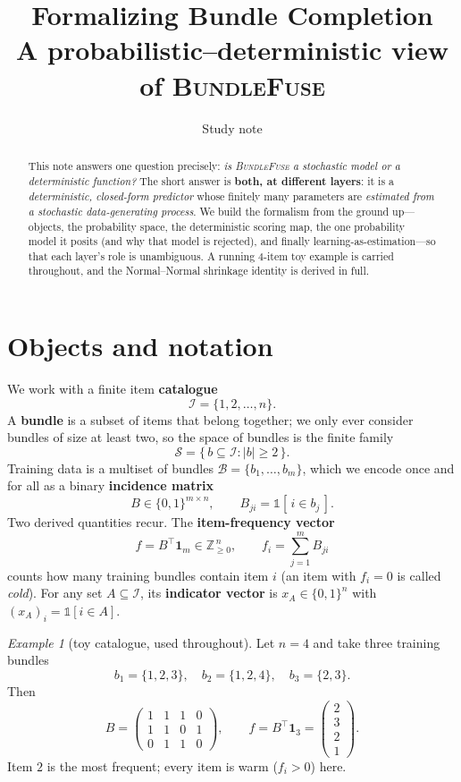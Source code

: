 \documentclass[11pt]{article}
\title{\textbf{Formalizing Bundle Completion}\\[2pt]
\large A probabilistic--deterministic view of \textsc{BundleFuse}}
\author{Study note}
\date{}
\theoremstyle{remark}
\newtheorem{example}{Example}
\newcommand{\I}{\mathcal{I}}
\newcommand{\B}{\mathcal{B}}
\newcommand{\Sfam}{\mathcal{S}}
\begin{document}
\maketitle

\begin{abstract}
\noindent This note answers one question precisely: \emph{is \textsc{BundleFuse} a stochastic model or a
deterministic function?} The short answer is \textbf{both, at different layers}: it is a \emph{deterministic,
closed-form predictor} whose finitely many parameters are \emph{estimated from a stochastic data-generating
process}. We build the formalism from the ground up---objects, the probability space, the deterministic scoring
map, the one probability model it posits (and why that model is rejected), and finally learning-as-estimation---so
that each layer's role is unambiguous. A running $4$-item toy example is carried throughout, and the Normal--Normal
shrinkage identity is derived in full.
\end{abstract}

\tableofcontents

\section{Objects and notation}
\label{sec:objects}

We work with a finite item \textbf{catalogue}
\[
  \I=\{1,2,\dots,n\}.
\]
A \textbf{bundle} is a subset of items that belong together; we only ever consider bundles of size at least two,
so the space of bundles is the finite family
\[
  \Sfam=\{\,b\subseteq\I : |b|\ge 2\,\}.
\]
Training data is a multiset of bundles $\B=\{b_1,\dots,b_m\}$, which we encode once and for all as a binary
\textbf{incidence matrix}
\[
  B\in\{0,1\}^{m\times n},\qquad B_{ji}=\mathbb{1}[\,i\in b_j\,].
\]
Two derived quantities recur. The \textbf{item-frequency vector}
\[
  f = B^{\!\top}\mathbf{1}_m\in\mathbb{Z}_{\ge 0}^{\,n},\qquad f_i=\sum_{j=1}^m B_{ji}
\]
counts how many training bundles contain item $i$ (an item with $f_i=0$ is called \emph{cold}). For any set
$A\subseteq\I$, its \textbf{indicator vector} is $x_A\in\{0,1\}^n$ with $(x_A)_i=\mathbb{1}[i\in A]$.

\begin{example}[toy catalogue, used throughout]\label{ex:toy}
Let $n=4$ and take three training bundles
\[
  b_1=\{1,2,3\},\quad b_2=\{1,2,4\},\quad b_3=\{2,3\}.
\]
Then
\[
  B=\begin{pmatrix}1&1&1&0\\ 1&1&0&1\\ 0&1&1&0\end{pmatrix},
  \qquad
  f=B^{\!\top}\mathbf 1_3=\begin{pmatrix}2\\3\\2\\1\end{pmatrix}.
\]
Item $2$ is the most frequent; every item is warm ($f_i>0$) here.
\end{example}
\end{document}
